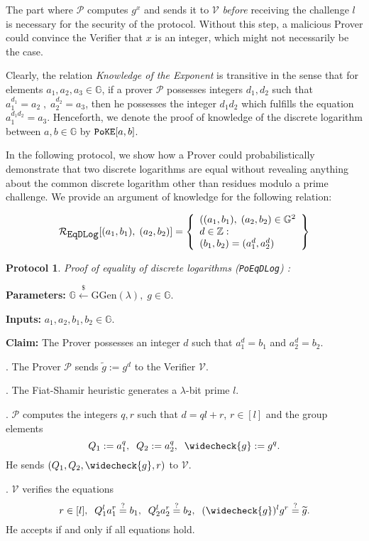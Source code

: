 \documentclass[11pt, lettersize, notitlepage, leqno, footskip=0.6cm]{article}
\newcommand{\wti}{\widetilde}
\newcommand{\mc}{\mathcal}
\newcommand{\mb}{\mathbb}
\newcommand{\mr}{\mathrm}
\newcommand{\lamb}{\lambda}
\newcommand{\weck}{\widecheck}
\newcommand{\mP}{\mc{P}}
\newcommand{\vs}{\vspace{-0.15cm}}
\newcommand{\noin}{\noindent}
\newcommand{\sta}{\stackrel{?}{=}}
\newtheorem{Prot}[Thm]{Protocol}
\numberwithin{equation}{section}
\begin{document}
The part where $\mc{P}$ computes $g^x$ and sends it to $\mc{V}$ \textit{before} receiving the challenge $l$ is necessary for the security of the protocol. Without this step, a malicious Prover could convince the Verifier that $x$ is an integer, which might not necessarily be the case.

Clearly, the relation \textit{Knowledge of the Exponent} is transitive in the sense that for elements $a_1,a_2,a_3\in\mb{G}$, if a prover $\mP$ possesses integers $d_1,d_2$ such that $a_1^{d_1} = a_2\;,\;a_2^{d_2} = a_3$, then he possesses the integer $d_1d_2$ which fulfills the equation $a_1^{d_1d_2} = a_3$. Henceforth, we denote the proof of knowledge of the discrete logarithm between $a,b\in\mb{G}$ by $\verb|PoKE|[a,b]$. 

In the following protocol, we show how a Prover could probabilistically demonstrate that two discrete logarithms are equal without revealing anything about the common discrete logarithm other than residues modulo a prime challenge. We provide an argument of knowledge for  the following relation:

\[
  \mc{R}_{{\protect\verb|EqDLog|}}[(a_1, b_1),\;(a_2,b_2)] = \left\{\begin{array}{l}
    ((a_1, b_1),\; (a_2,b_2)\in\mb{G}^2\\
    d\in\mb{Z}: \\
    (b_1,b_2) = (a_1^d,a_2^d)
  \end{array}\right\}
\]
\vspace{0.15cm}


\begin{Prot}\label{EqDLog} \normalfont \textit{Proof of equality of discrete logarithms} (\verb|PoEqDLog|) :\end{Prot} \vspace{-0.3cm}

\noindent \textbf{Parameters:} $\mb{G}\xleftarrow{\$} \mr{GGen}(\lamb), \; g\in \mb{G}$.

\noindent \textbf{Inputs:} $a_1, a_2, b_1, b_2 \in \mb{G}$.

\noindent \textbf{Claim:} The Prover possesses an integer $d$ such that $a_1^d = b_1$ and $a_2^d = b_2$.

\begin{prf1}\normalfont \noin 1. The Prover $\mc{P}$ sends $\wti{g}:= g^d$ to the Verifier $\mc{V}$.

. The Fiat-Shamir heuristic generates a $\lamb$-bit prime $l$. 

. $\mc{P}$ computes the integers $q, r$ such that $d = ql+r$, $r\in [l]$ and the group elements \vs $$Q_1:= a_1^q,\;\; Q_2:= a_2^q,\;\; \weck{g}:= g^q.$$ He sends $(Q_1, Q_2, \weck{g}, r)$ to $\mc{V}$.

. $\mc{V}$ verifies the equations \vs $$r\in [l],\;\;Q_1^la_1^r \sta  b_1, \;\; Q_2^la_2^r \sta  b_2, \;\; (\weck{g})^lg^r \sta \wti{g}.$$ He accepts if and only if all equations hold.\end{prf1}
\end{document}
